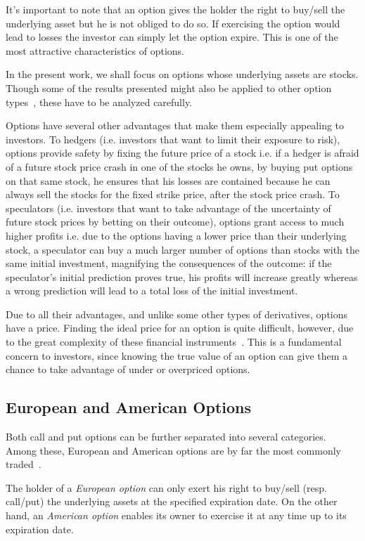 \documentclass[a4paper,twocolumn,aps,prd,longbibliography,superscriptaddress]{revtex4-1}
\begin{document}
It's important to note that an option gives the holder the right to buy/sell the underlying asset but he is not obliged to do so. If exercising the option would lead to losses the investor can simply let the option expire. This is one of the most attractive characteristics of options.

In the present work, we shall focus on options whose underlying assets are stocks. Though some of the results presented might also be applied to other option types~\cite{Hull}, these have to be analyzed carefully.


Options have several other advantages that make them especially appealing to investors.
To hedgers (i.e. investors that want to limit their exposure to risk), options provide safety by fixing the future price of a stock i.e. if a hedger is afraid of a future stock price crash in one of the stocks he owns, by buying put options on that same stock, he ensures that his losses are contained because he can always sell the stocks for the fixed strike price, after the stock price crash.
To speculators (i.e. investors that want to take advantage of the uncertainty of future stock prices by betting on their outcome), options grant access to much higher profits i.e. due to the options having a lower price than their underlying stock, a speculator can buy a much larger number of options than stocks with the same initial investment, magnifying the consequences of the outcome: if the speculator's initial prediction proves true, his profits will increase greatly whereas a wrong prediction will lead to a total loss of the initial investment.

Due to all their advantages, and unlike some other types of derivatives, options have a price. Finding the ideal price for an option is quite difficult, however, due to the great complexity of these financial instruments~\cite{Wilmott1}. This is a fundamental concern to investors, since knowing the true value of an option can give them a chance to take advantage of under or overpriced options.




\subsection{European and American Options}
Both call and put options can be further separated into several categories. Among these, European and American options are by far the most commonly traded~\cite{Hull}.

The holder of a \textit{European option} can only exert his right to buy/sell (resp. call/put) the underlying assets at the specified expiration date.
On the other hand, an \textit{American option} enables its owner to exercise it at any time up to its expiration date.
\end{document}
